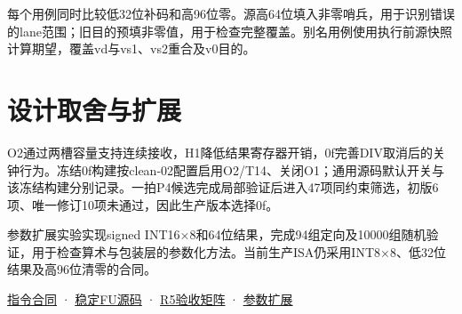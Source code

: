 每个用例同时比较低32位补码和高96位零。源高64位填入非零哨兵，用于识别错误的lane范围；旧目的预填非零值，用于检查完整覆盖。别名用例使用执行前源快照计算期望，覆盖vd与vs1、vs2重合及v0目的。\par

\section{设计取舍与扩展}

O2通过两槽容量支持连续接收，H1降低结果寄存器开销，0f完善DIV取消后的关钟行为。冻结0f构建按clean-02配置启用O2/T14、关闭O1；通用源码默认开关与该冻结构建分别记录。一拍P4候选完成局部验证后进入47项同约束筛选，初版6项、唯一修订10项未通过，因此生产版本选择0f。\par

参数扩展实验实现signed INT16×8和64位结果，完成94组定向及10000组随机验证，用于检查算术与包装层的参数化方法。当前生产ISA仍采用INT8×8、低32位结果及高96位清零的合同。\par

\href{https://github.com/cc77-builder/riscv/blob/eca41d7cd959f5f3c4f240e382919c492d1ccb96/team/spec/vdot.md}{指令合同} · \href{https://github.com/cc77-builder/riscv/blob/0f12df675378556670afd0dd2153f47fcb330610/src/main/scala/xiangshan/backend/fu/wrapper/VDotElastic.scala}{稳定FU源码} · \href{https://github.com/cc77-builder/riscv/blob/eca41d7cd959f5f3c4f240e382919c492d1ccb96/team/optimizations/o2/integration/firstdot-v2-0f/acceptance/acceptance-matrix.json}{R5验收矩阵} · \href{https://github.com/cc77-builder/riscv/blob/eca41d7cd959f5f3c4f240e382919c492d1ccb96/team/docs/t15-parameter-extension.md}{参数扩展}\par
